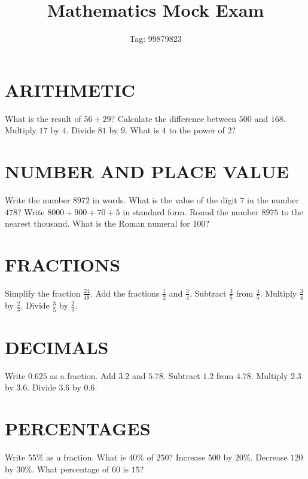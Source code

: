 \documentclass{exam}
\begin{document}
\title{Mathematics Mock Exam}
\date{Tag: 99879823}
\maketitle

\section{ARITHMETIC}
\begin{questions}
\question What is the result of $56 + 29$?
\question Calculate the difference between $500$ and $168$.
\question Multiply $17$ by $4$.
\question Divide $81$ by $9$.
\question What is $4$ to the power of $2$?
\end{questions}

\section{NUMBER AND PLACE VALUE}
\begin{questions}
\question Write the number $8972$ in words.
\question What is the value of the digit $7$ in the number $478$?
\question Write $8000 + 900 + 70 + 5$ in standard form.
\question Round the number $8975$ to the nearest thousand.
\question What is the Roman numeral for $100$?
\end{questions}

\section{FRACTIONS}
\begin{questions}
\question Simplify the fraction $\frac{24}{48}$.
\question Add the fractions $\frac{1}{2}$ and $\frac{3}{4}$.
\question Subtract $\frac{3}{5}$ from $\frac{4}{5}$.
\question Multiply $\frac{3}{4}$ by $\frac{2}{3}$.
\question Divide $\frac{3}{5}$ by $\frac{2}{3}$.
\end{questions}

\section{DECIMALS}
\begin{questions}
\question Write $0.625$ as a fraction.
\question Add $3.2$ and $5.78$.
\question Subtract $1.2$ from $4.78$.
\question Multiply $2.3$ by $3.6$.
\question Divide $3.6$ by $0.6$.
\end{questions}

\section{PERCENTAGES}
\begin{questions}
\question Write $55\%$ as a fraction.
\question What is $40\%$ of $250$?
\question Increase $500$ by $20\%$.
\question Decrease $120$ by $30\%$.
\question What percentage of $60$ is $15$?
\end{questions}
\end{document}
